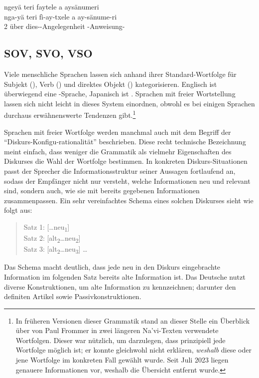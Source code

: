 \begin{interlin}
	\glll ngeyä teri faytele a aysänumeri \\
	nga-yä teri fì-ay-txele a ay-sänume-ri \\
	2 über dies--Angelegenheit  -Anweisung-\\
\end{interlin}

\subsection{SOV, SVO, VSO} Viele menschliche Sprachen lassen sich anhand ihrer Standard-Wortfolge für Subjekt (), Verb () und direktes Objekt () kategorisieren. Englisch ist überwiegend eine -Sprache, Japanisch ist . Sprachen mit freier Wortstellung lassen sich nicht leicht in dieses System einordnen, obwohl es bei einigen Sprachen durchaus erwähnenswerte Tendenzen gibt.\footnote{In früheren Versionen dieser Grammatik stand an dieser Stelle ein Überblick über von Paul Frommer in zwei längeren Na'vi-Texten verwendete Wortfolgen. Dieser war nützlich, um darzulegen, dass prinzipiell jede Wortfolge möglich ist; er konnte gleichwohl nicht erklären, \textit{weshalb} diese oder jene Wortfolge im konkreten Fall gewählt wurde. Seit Juli 2023 liegen genauere Informationen vor, weshalb die Übersicht entfernt wurde.} 

Sprachen mit freier Wortfolge werden manchmal auch mit dem Begriff der ``Diskurs-Konfigu-rationalität'' beschrieben. Diese recht technische Bezeichnung meint einfach, dass weniger die Grammatik als vielmehr Eigenschaften des Diskurses die Wahl der Wortfolge bestimmen. In konkreten Diskurs-Situationen passt der Sprecher die Informationsstruktur seiner Aussagen fortlaufend an, sodass der Empfänger nicht nur versteht, welche Informationen neu und relevant sind, sondern auch, wie sie mit bereits gegebenen Informationen zusammenpassen. Ein sehr vereinfachtes Schema eines solchen Diskurses sieht wie folgt aus:

\begin{quotation}
	\noindent Satz 1: [\dots\space neu\textsubscript{1}]\\
	Satz 2: [alt\textsubscript{2}\dots\space neu\textsubscript{2}]\\
	Satz 3: [alt\textsubscript{2}\dots\space neu\textsubscript{3}] \dots
\end{quotation}
Das Schema macht deutlich, dass jede neu in den Diskurs eingebrachte Information im folgenden Satz bereits alte Information ist. Das Deutsche nutzt diverse Konstruktionen, um alte Information zu kennzeichnen; darunter den definiten Artikel sowie Passivkonstruktionen.

